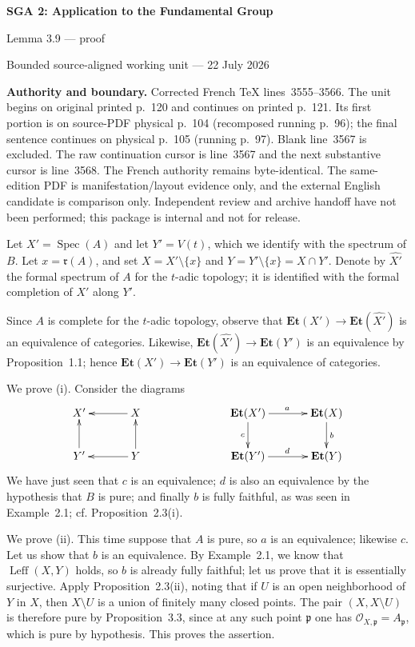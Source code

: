 \documentclass[10pt,a4paper]{article}
\newcommand{\Et}{\mathbf{Et}}
\newcommand{\Leffc}{\operatorname{Leff}}
\begin{document}
\begin{center}
  {\Large\bfseries SGA 2: Application to the Fundamental Group}\par\smallskip
  {\large Lemma 3.9 --- proof}\par
  {\normalsize Bounded source-aligned working unit --- 22 July 2026}
\end{center}

\noindent\colorbox{softgray}{\parbox{0.95\linewidth}{\footnotesize\textbf{Authority and boundary.}
Corrected French TeX lines~3555--3566. The unit begins on original printed
p.~120 and continues on printed p.~121. Its first portion is on source-PDF
physical p.~104 (recomposed running p.~96); the final sentence continues on
physical p.~105 (running p.~97). Blank line~3567 is excluded. The raw
continuation cursor is line~3567 and the next substantive cursor is line~3568.
The French authority remains byte-identical. The same-edition PDF is
manifestation/layout evidence only, and the external English candidate is
comparison only. Independent review and archive handoff have not been
performed; this package is internal and not for release.}}

\medskip
Let $X'=\operatorname{Spec}(A)$ and let $Y'=V(t)$, which we identify with
the spectrum of $B$. Let $x=\mathfrak r(A)$, and set
$X=X'\setminus\{x\}$ and $Y=Y'\setminus\{x\}=X\cap Y'$. Denote by
$\widehat{X'}$ the formal spectrum of $A$ for the $t$-adic topology; it is
identified with the formal completion of $X'$ along $Y'$.

Since $A$ is complete for the $t$-adic topology, observe that
$\Et(X')\longrightarrow\Et(\widehat{X'})$ is an equivalence of categories.
Likewise, $\Et(\widehat{X'})\longrightarrow\Et(Y')$ is an equivalence by
Proposition~1.1; hence $\Et(X')\longrightarrow\Et(Y')$ is an equivalence of
categories.

We prove \textup{(i)}. Consider the diagrams
\[
\xymatrix@C=12mm@R=8mm{
  X' & X\ar[l] &&
  \Et(X')\ar[r]^{a}\ar[d]_{c} & \Et(X)\ar[d]^{b}\\
  Y'\ar[u] & Y\ar[l]\ar[u] &&
  \Et(Y')\ar[r]^{d} & \Et(Y)
}
\]
We have just seen that $c$ is an equivalence; $d$ is also an equivalence by
the hypothesis that $B$ is pure; and finally $b$ is fully faithful, as was
seen in Example~2.1; cf. Proposition~2.3\textup{(i)}.

We prove \textup{(ii)}. This time suppose that $A$ is pure, so $a$ is an
equivalence; likewise $c$. Let us show that $b$ is an equivalence. By
Example~2.1, we know that $\Leffc(X,Y)$ holds, so $b$ is already fully
faithful; let us prove that it is essentially surjective. Apply
Proposition~2.3\textup{(ii)}, noting that if $U$ is an open neighborhood of
$Y$ in $X$, then $X\setminus U$ is a union of finitely many closed points.
The pair $(X,X\setminus U)$ is therefore pure by Proposition~3.3, since at
any such point $\mathfrak p$ one has
$\mathcal O_{X,\mathfrak p}=A_{\mathfrak p}$, which is pure by hypothesis.
This proves the assertion.
\end{document}
